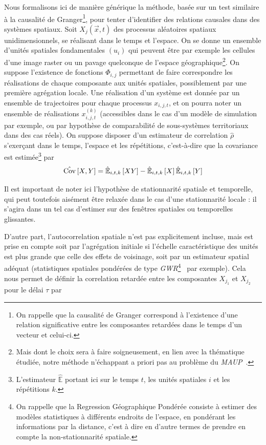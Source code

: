 {Nous formalisons ici de manière générique la méthode, basée sur un test similaire à la causalité de Granger\footnote{On rappelle que la causalité de Granger correspond à l'existence d'une relation significative entre les composantes retardées dans le temps d'un vecteur et celui-ci.}, pour tenter d'identifier des relations causales dans des systèmes spatiaux. Soit $X_j(\vec{x},t)$ des processus aléatoires spatiaux unidimensionnels, se réalisant dans le temps et l'espace. On se donne un ensemble d'unités spatiales fondamentales $(u_i)$ qui peuvent être par exemple les cellules d'une image raster ou un pavage quelconque de l'espace géographique\footnote{Mais dont le choix sera à faire soigneusement, en lien avec la thématique étudiée, notre méthode n'échappant a priori pas au problème du \emph{MAUP}~\cite{paez2005spatial}.}. On suppose l'existence de fonctions $\Phi_{i,j}$ permettant de faire correspondre les réalisations de chaque composante aux unités spatiales, possiblement par une première agrégation locale. Une réalisation d'un système est donnée par un ensemble de trajectoires pour chaque processus $x_{i,j,t}$, et on pourra noter un ensemble de réalisations $x^{(k)}_{i,j,t}$ (accessibles dans le cas d'un modèle de simulation par exemple, ou par hypothèse de comparabilité de sous-systèmes territoriaux dans des cas réels). On suppose disposer d'un estimateur de correlation $\hat{\rho}$ s'exerçant dans le temps, l'espace et les répétitions, c'est-à-dire que la covariance est estimée\footnote{L'estimateur $\hat{\mathbb{E}}$ portant ici sur le temps $t$, les unités spatiales $i$ et les répétitions $k$.} par
\[
\hat{\operatorname{Cov}}\left[X,Y\right] = \hat{\mathbb{E}}_{i,t,k}\left[XY\right] - \hat{\mathbb{E}}_{i,t,k}\left[X\right]\hat{\mathbb{E}}_{i,t,k}\left[Y\right]
\]

Il est important de noter ici l'hypothèse de stationnarité spatiale et temporelle, qui peut toutefois aisément être relaxée dans le cas d'une stationnarité locale : il s'agira dans un tel cas d'estimer sur des fenêtres spatiales ou temporelles glissantes.

D'autre part, l'autocorrelation spatiale n'est pas explicitement incluse, mais est prise en compte soit par l'agrégation initiale si l'échelle caractéristique des unités est plus grande que celle des effets de voisinage, soit par un estimateur spatial adéquat (statistiques spatiales pondérées de type \emph{GWR}\footnote{On rappelle que la Regression Géographique Pondérée consiste à estimer des modèles statistiques à différents endroits de l'espace, en pondérant les informations par la distance, c'est à dire en d'autre termes de prendre en compte la non-stationnarité spatiale.}~\cite{brunsdon1998geographically} par exemple). Cela nous permet de définir la correlation retardée entre les composantes $X_{j_1}$ et $X_{j_2}$ pour le délai $\tau$ par
}

